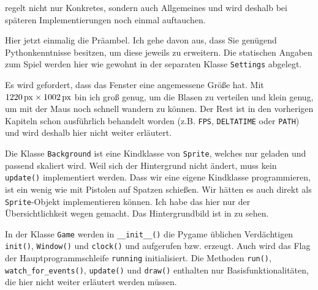  regelt nicht nur Konkretes, sondern auch Allgemeines und wird deshalb bei späteren Implementierungen noch einmal auftauchen. 

Hier jetzt einmalig die Präambel. Ich gehe davon aus, dass Sie genügend Pythonkenntnisse besitzen, um diese jeweils zu erweitern. Die statischen Angaben zum Spiel werden hier wie gewohnt in der separaten Klasse \texttt{Settings} abgelegt. 

Es wird gefordert, dass das Fenster eine angemessene Größe hat. Mit $\unit[1220]{px} \times \unit[1002]{px}$ bin ich groß genug, um die Blasen zu verteilen und klein genug, um mit der Maus noch schnell wandern zu können. Der Rest ist in den vorherigen Kapiteln schon ausführlich behandelt worden (z.B. \texttt{FPS}, \texttt{DELTATIME} oder \texttt{PATH}) und wird deshalb hier nicht weiter erläutert.


\newpage
{}


Die Klasse \texttt{Background} ist eine Kindklasse von \texttt{Sprite}, welches nur geladen und passend skaliert wird. Weil sich der Hintergrund nicht ändert, muss kein \texttt{update()} implementiert werden. Dass wir eine eigene Kindklasse programmieren, ist ein wenig wie mit Pistolen auf Spatzen schießen. Wir hätten es auch direkt als \texttt{Sprite}-Objekt implementieren können. Ich habe das hier nur der Übersichtlichkeit wegen gemacht. Das Hintergrundbild ist in  zu sehen.

\newpage
{}

In der Klasse \texttt{Game} werden in \texttt{\_\_init\_\_()} die Pygame üblichen Verdächtigen \texttt{init()}, \texttt{Window()} und \texttt{clock()} und aufgerufen bzw. erzeugt. Auch wird das Flag der Hauptprogrammschleife \texttt{running} initialisiert. Die Methoden \texttt{run()}, \texttt{watch\_for\_events()}, \texttt{up\-date()} und \texttt{draw()} enthalten nur Basisfunktionalitäten, die hier nicht weiter erläutert werden müssen. 



